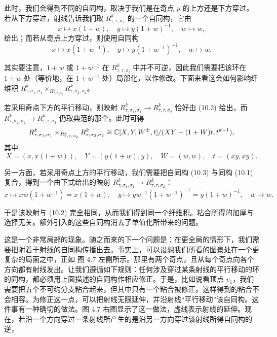 此时，我们会得到不同的自同构，取决于我们是在奇点 $p$ 的上方还是下方穿过。若从下方穿过，射线告诉我们取 $R^k_{\tau,\tau,\sigma_1}$ 的一个自同构，它由
\begin{equation}
x\mapsto x(1+w),\quad y\mapsto y(1+w)^{-1},\quad w\mapsto w, \tag{4.10.2}
\end{equation}
给出；而若从奇点上方穿过，则使用自同构
\begin{equation}
x\mapsto x(1+w^{-1}),\quad y\mapsto y(1+w^{-1})^{-1},\quad w\mapsto w. \tag{4.10.3}
\end{equation}

其实要注意，$1+w$ 或 $1+w^{-1}$ 在 $R^k_{\tau,\tau,\sigma_i}$ 中并不可逆，因此我们需要把该环在 $1+w$ 处（等价地，在 $1+w^{-1}$ 处）局部化，以作修改。下面来看这会如何影响纤维积 $R^k_{\tau,\sigma_1,\sigma_1}\times_{R^k_{\tau,\tau,\sigma_2}}R^k_{\tau,\sigma_2,\sigma_2}$。

若采用奇点下方的平行移动，则映射 $R^k_{\tau,\sigma_1,\sigma_1}\to R^k_{\tau,\tau,\sigma_2}$ 恰好由 (10.2) 给出，而 $R^k_{\tau,\sigma_2,\sigma_2}\to R^k_{\tau,\tau,\sigma_2}$ 仍取典范的那个。此时可得
\[
R^k_{\tau,\sigma_1,\sigma_1}\times_{R^k_{\tau,\tau,\sigma_2}}R^k_{\tau,\sigma_2,\sigma_2}\cong\mathbb{C}[X,Y,W^{\pm},t]/(XY-(1+W)t,t^{k+1}),
\]
其中
\[
X=(x,x(1+w)),\quad Y=(y(1+w),y),\quad W=(w,w),\quad t=(xy,xy).
\]

另一方面，若采用奇点上方的平行移动，我们需要把自同构 (10.3) 与同构 (10.1) 复合，得到一个由下式给出的映射 $R^k_{\tau,\sigma_1,\sigma_1}\to R^k_{\tau,\tau,\sigma_2}$：
\[
x\mapsto xw(1+w^{-1})=x(1+w),\quad y\mapsto yw^{-1}(1+w^{-1})^{-1}=y(1+w)^{-1},\quad w\mapsto w.
\]

于是该映射与 (10.2) 完全相同，从而我们得到同一个纤维积。粘合所得的加厚与选择无关。额外引入的这些自同构消去了单值化所带来的问题。

这是一个非常局部的现象。随之而来的下一个问题是：在更全局的情形下，我们需要把附着于射线的自同构传播出去。事实上，可以设想我们所看的图景处在一个更复杂的局面之中，正如 图 4.7 左侧所示。那里有两个奇点，且从每个奇点向各个方向都有射线发出。让我们遵循如下规则：任何涉及穿过某条射线的平行移动的环的同构，都必须用上面描述的自同构作相应修正。于是，比如说看顶点 $v_1$，我们需要把五个不可约分支粘合起来，但其中只有一个粘合被修正。这样得到的粘合不会相容。为修正这一点，可以把射线无限延伸，并沿射线“平行移动”该自同构。这件事有一种确切的做法。图 4.7 右图显示了这一做法，虚线表示射线的延伸。现在，若沿一个方向穿过一条射线所产生的是沿另一方向穿过该射线所得自同构的逆，

